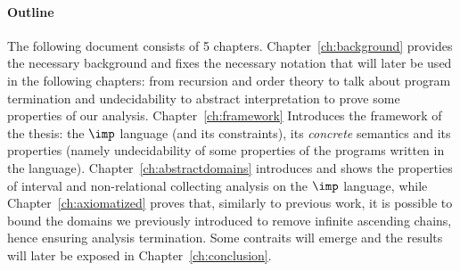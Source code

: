 \paragraph*{Outline}
The following document consists of 5
chapters. Chapter~\ref{ch:background} provides the necessary
background and fixes the necessary notation that will later be used in
the following chapters: from recursion and order theory to talk about
program termination and undecidability to abstract interpretation to
prove some properties of our analysis. Chapter~\ref{ch:framework}
Introduces the framework of the thesis: the \(\imp\) language (and its
constraints), its \emph{concrete} semantics and its properties (namely
undecidability of some properties of the programs written in the
language). Chapter~\ref{ch:abstractdomains} introduces and shows the
properties of interval and non-relational collecting analysis on the
\(\imp\) language, while Chapter~\ref{ch:axiomatized} proves that,
similarly to previous work, it is possible to bound the domains we
previously introduced to remove infinite ascending chains, hence
ensuring analysis termination. Some contraits will emerge and the
results will later be exposed in Chapter~\ref{ch:conclusion}.
